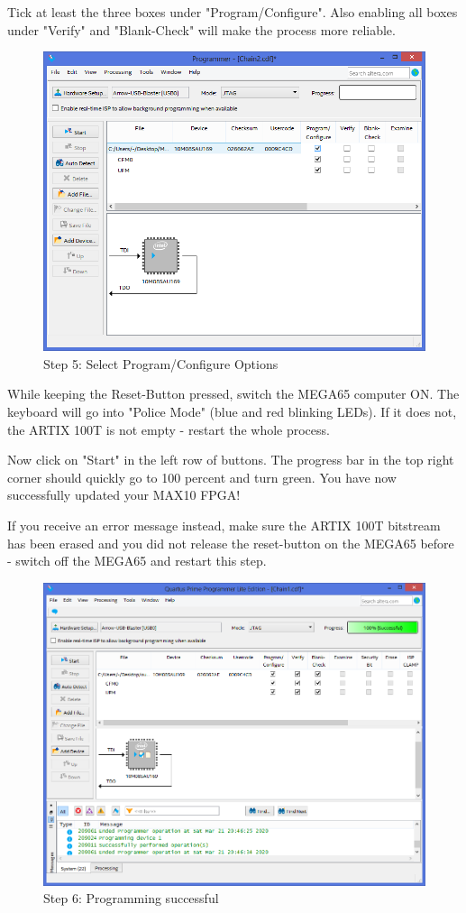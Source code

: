 Tick at least the three boxes under "Program/Configure". Also enabling all boxes under "Verify" and "Blank-Check"
will make the process more reliable.

\begin{figure}
  \includegraphics[width=\linewidth]{images/max10_05.png}
  \caption{Step 5: Select Program/Configure Options}
  \label{fig:max10_05}
\end{figure}

While keeping the Reset-Button pressed, switch the MEGA65 computer ON. The keyboard will go into "Police Mode"
(blue and red blinking LEDs). If it does not, the ARTIX 100T is not empty - restart the whole process.

Now click on "Start" in the left row of buttons. The progress bar in the top right corner should quickly go to
100 percent and turn green. You have now successfully updated your MAX10 FPGA!

If you receive an error message instead, make sure the ARTIX 100T bitstream has been erased and you did not
release the reset-button on the MEGA65 before - switch off the MEGA65 and restart this step.

\begin{figure}
  \includegraphics[width=\linewidth]{images/max10_06.png}
  \caption{Step 6: Programming successful}
  \label{fig:max10_06}
\end{figure}
